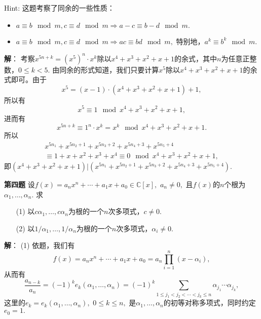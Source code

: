 Hint: 这题考察了同余的一些性质：
\begin{itemize}
\item $a \equiv b \mod{m}, c \equiv d \mod{m} \Rightarrow a-c \equiv b-d \mod{m}.$
\item $a \equiv b \mod{m}, c \equiv d \mod{m} \Rightarrow ac \equiv bd \mod{m},$ 特别地，$a^k \equiv b^k \mod{m}.$
\end{itemize}

\ifIncludeAnswer

\newpageorvspace

{\bf 解}： 考察$x^{5n+k} = (x^5)^n \cdot x^k$除以$x^4 + x^3 + x^2 + x + 1$的余式，其中$n$为任意正整数，$0 \leq k < 5.$ 由同余的形式知道，我们只要计算$x^5$除以$x^4 + x^3 + x^2 + x + 1$的余式即可。由于
$$x^5 = (x-1) \cdot (x^4 + x^3 + x^2 + x + 1) + 1,$$
所以有
$$x^5 \equiv 1 \mod{x^4 + x^3 + x^2 + x + 1},$$
进而有
$$x^{5n+k} \equiv 1^n \cdot x^k = x^k \mod{x^4 + x^3 + x^2 + x + 1}.$$
所以
\begin{multline*}
x^{5n_1} + x^{5n_2+1} + x^{5n_3+2} + x^{5n_4+3} + x^{5n_5+4} \\
\equiv 1 + x + x^2 + x^3 + x^4 \equiv 0 \mod{x^4 + x^3 + x^2 + x + 1},
\end{multline*}
即$(x^4 + x^3 + x^2 + x + 1) | (x^{5n_1} + x^{5n_2+1} + x^{5n_3+2} + x^{5n_4+3} + x^{5n_5+4}).$

\fi  %

\newpageorvspace

{\bf 第四题} 设$f(x) = a_n x^n + \cdots + a_1 x + a_0 \in \mathbb{C}[x],$ $a_n \neq 0,$ 且$f(x)$的$n$个根为$\alpha_1, \ldots, \alpha_n.$ 求
\begin{itemize}
\item[(1)] 以$c\alpha_1, \ldots, c\alpha_n$为根的一个$n$次多项式，$c \neq 0.$
\item[(2)] 以$1/\alpha_1, \ldots, 1/\alpha_n$为根的一个$n$次多项式，$\alpha_i \neq 0.$
\end{itemize}

\ifIncludeAnswer

\newpageorvspace

{\bf 解}： (1) 依题，我们有
$$f(x) = a_n x^n + \cdots + a_1 x + a_0 = a_n \prod\limits_{i=1}^n (x - \alpha_i),$$
从而有
$$
\dfrac{a_{n-k}}{a_n} = (-1)^k e_k(\alpha_1, \ldots, \alpha_n) = (-1)^k \sum\limits_{1 \leqslant j_{1} < j_{2} < \cdots < j_{k} \leqslant n} \alpha_{j_{1}} \dotsm \alpha_{j_{k}},
$$
这里的$e_k = e_k(\alpha_1, \ldots, \alpha_n),$ $0\leqslant k \leqslant n,$ 是$\alpha_1, \ldots, \alpha_n$的初等对称多项式，同时约定$e_0 = 1.$

